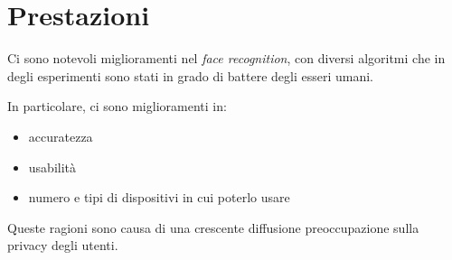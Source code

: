 \documentclass{report}
\begin{document}
\section{Prestazioni}
Ci sono notevoli miglioramenti nel \textit{face recognition}, con 
diversi algoritmi che in degli esperimenti sono stati in grado di 
battere degli esseri umani.

\noindent In particolare, ci sono miglioramenti in:
\begin{itemize}
    \item accuratezza
    \item usabilità
    \item numero e tipi di dispositivi in cui poterlo usare 
\end{itemize}

\noindent Queste ragioni sono causa di una crescente diffusione 
preoccupazione sulla privacy degli utenti.
\end{document}
